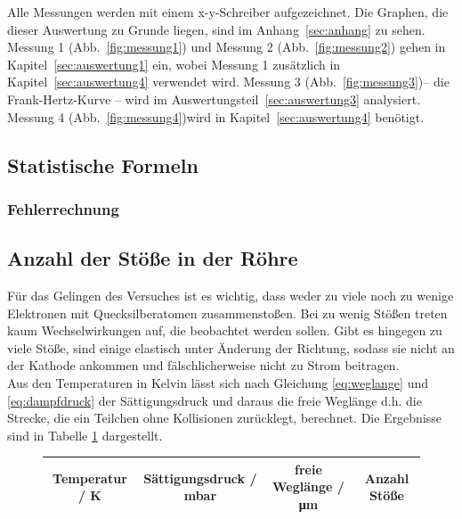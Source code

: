 Alle Messungen werden mit einem x-y-Schreiber aufgezeichnet. Die Graphen, die dieser Auswertung zu Grunde liegen, sind im Anhang~\ref{sec:anhang} zu sehen.
Messung 1 (Abb.~\ref{fig:messung1})  und Messung 2 (Abb.~\ref{fig:messung2}) gehen in Kapitel~\ref{sec:auswertung1} ein, wobei Messung 1 zusätzlich in Kapitel~\ref{sec:auswertung4} verwendet wird. Messung 3 (Abb.~\ref{fig:messung3})-- die Frank-Hertz-Kurve --  wird im Auswertungsteil~\ref{sec:auswertung3} analysiert. Messung 4 (Abb.~\ref{fig:messung4})wird in Kapitel~\ref{sec:auswertung4}
 benötigt.
\subsection{Statistische Formeln}
\subsubsection{Fehlerrechnung}
\label{sec:Fehlerrechnung}



\subsection{Anzahl der Stöße in der Röhre}
Für das Gelingen des Versuches ist es wichtig, dass weder zu viele noch zu wenige Elektronen mit Quecksilberatomen zusammenstoßen. Bei zu wenig Stößen treten kaum Wechselwirkungen auf, die beobachtet werden sollen. Gibt es hingegen zu viele Stöße, sind einige elastisch unter Änderung der Richtung, sodass sie nicht an der Kathode ankommen und fälschlicherweise nicht zu Strom beitragen. \\
Aus den Temperaturen in Kelvin lässt sich nach Gleichung \eqref{eq:weglange} und \eqref{eq:dampfdruck} der Sättigungsdruck und daraus die freie Weglänge d.h. die Strecke, die ein Teilchen ohne Kollisionen zurücklegt, berechnet. Die Ergebnisse sind in Tabelle \ref{tab:temperaturen} dargestellt.



\begin{figure}[h!]
	\centering
	\begin{tabular}{cccc}
		Temperatur / \si{\kelvin} & Sättigungsdruck / \si{\milli\bar} & freie Weglänge / \si{\micro\meter} & Anzahl Stöße \\
		\hline
		
	\end{tabular}
	\label{tab:temperaturen}
\end{figure}




